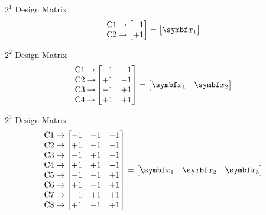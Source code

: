 \begin{Example}{$ 2^1 $ Design Matrix}{}
    \[ \begin{matrix}
            \text{C1}\rightarrow \\
            \text{C2}\rightarrow
        \end{matrix}\begin{bmatrix}
            -1 \\
            +1
        \end{bmatrix}=\begin{bmatrix}
            \Vector{x}_1
        \end{bmatrix} \]
\end{Example}
\begin{Example}{$ 2^2 $ Design Matrix}{}
    \[ \begin{matrix}
            \text{C1}\rightarrow \\
            \text{C2}\rightarrow \\
            \text{C3}\rightarrow \\
            \text{C4}\rightarrow
        \end{matrix}\begin{bmatrix}
            -1 & -1 \\
            +1 & -1 \\
            -1 & +1 \\
            +1 & +1
        \end{bmatrix}=\begin{bmatrix}
            \Vector{x}_1 & \Vector{x}_2
        \end{bmatrix} \]
\end{Example}
\begin{Example}{$ 2^3 $ Design Matrix}{}
    \[ \begin{matrix}
            \text{C1}\rightarrow \\
            \text{C2}\rightarrow \\
            \text{C3}\rightarrow \\
            \text{C4}\rightarrow \\
            \text{C5}\rightarrow \\
            \text{C6}\rightarrow \\
            \text{C7}\rightarrow \\
            \text{C8}\rightarrow
        \end{matrix}\begin{bmatrix}
            -1 & -1 & -1 \\
            +1 & -1 & -1 \\
            -1 & +1 & -1 \\
            +1 & +1 & -1 \\
            -1 & -1 & +1 \\
            +1 & -1 & +1 \\
            -1 & +1 & +1 \\
            +1 & -1 & +1
        \end{bmatrix}=\begin{bmatrix}
            \Vector{x}_1 & \Vector{x}_2 & \Vector{x}_3
        \end{bmatrix} \]
\end{Example}

